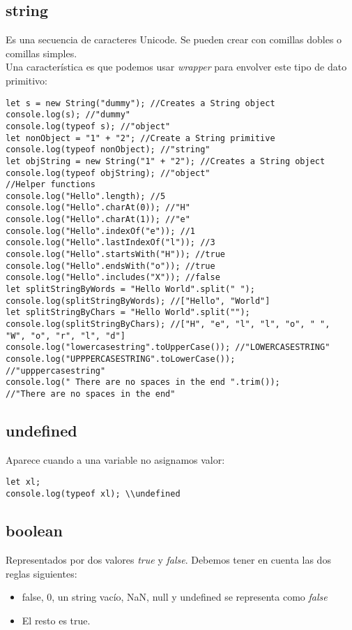 \documentclass[4paper]{article}
\begin{document}
\subsection{string}
Es una secuencia de caracteres Unicode. Se pueden crear con comillas dobles o comillas simples.\\
Una característica es que podemos usar \emph{wrapper} para envolver este tipo de dato primitivo:
\begin{lstlisting}
let s = new String("dummy"); //Creates a String object
console.log(s); //"dummy"
console.log(typeof s); //"object"
let nonObject = "1" + "2"; //Create a String primitive
console.log(typeof nonObject); //"string"
let objString = new String("1" + "2"); //Creates a String object
console.log(typeof objString); //"object"
//Helper functions
console.log("Hello".length); //5
console.log("Hello".charAt(0)); //"H"
console.log("Hello".charAt(1)); //"e"
console.log("Hello".indexOf("e")); //1
console.log("Hello".lastIndexOf("l")); //3
console.log("Hello".startsWith("H")); //true
console.log("Hello".endsWith("o")); //true
console.log("Hello".includes("X")); //false
let splitStringByWords = "Hello World".split(" ");
console.log(splitStringByWords); //["Hello", "World"]
let splitStringByChars = "Hello World".split("");
console.log(splitStringByChars); //["H", "e", "l", "l", "o", " ",
"W", "o", "r", "l", "d"]
console.log("lowercasestring".toUpperCase()); //"LOWERCASESTRING"
console.log("UPPPERCASESTRING".toLowerCase());
//"upppercasestring"
console.log(" There are no spaces in the end ".trim());
//"There are no spaces in the end"
\end{lstlisting}

\subsection{undefined}
Aparece cuando a una variable no asignamos valor:
\begin{lstlisting}
let xl;
console.log(typeof xl); \\undefined
\end{lstlisting}

\subsection{boolean}
Representados por dos valores \emph{true} y \emph{false}. Debemos tener en cuenta las dos reglas siguientes:
\begin{itemize}
\item false, 0, un string vacío, NaN, null y undefined se representa como \emph{false}
\item El resto es true.
\end{itemize}
\end{document}
